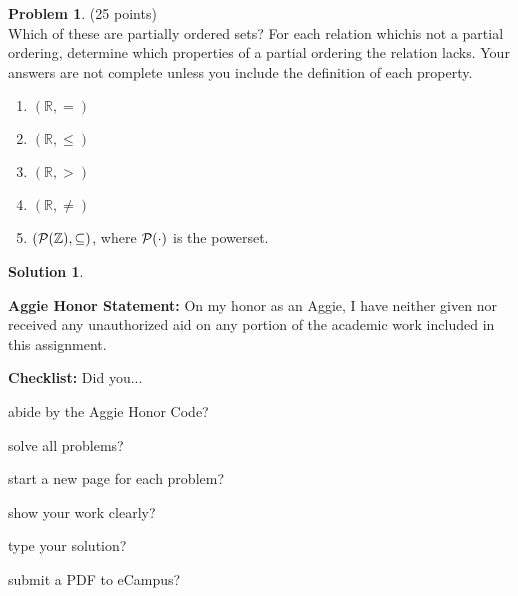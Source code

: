 \documentclass{article}
\theoremstyle{definition}
\newtheorem{problem}{Problem}
\newtheorem*{solution}{Solution}
\newcommand{\honor}{\noindent \textbf{Aggie Honor Statement: }On my honor as an Aggie, I have neither
  given nor received any unauthorized aid on any portion of the academic work included in this assignment.
}
\newcommand{\checklist}{\noindent\textbf{Checklist:}
Did you...
\begin{compactenum}
\item abide by the Aggie Honor Code?
\item solve all problems?
\item start a new page for each problem?
\item show your work clearly?
\item type your solution?
\item submit a PDF to eCampus?
\end{compactenum}
}
\begin{document}
\begin{problem} (25 points)\\
Which of these are partially ordered sets?  For each relation whichis not a partial ordering, determine which properties of a partial ordering the relation lacks. Your answers are not complete unless you include the definition of each property.
\begin{enumerate}
\item $(\mathbb{R},=)$
\item $(\mathbb{R},\leq)$
\item $(\mathbb{R},>)$
\item $(\mathbb{R},\neq)$
\item $(\cal{P}(\mathbb{Z}),\subseteq)$, where $\cal{P}(\cdot)$ is the powerset.
\end{enumerate}
\end{problem}

\begin{solution}\ \\

\end{solution}

\bigskip
\honor

\bigskip
\checklist
\end{document}
